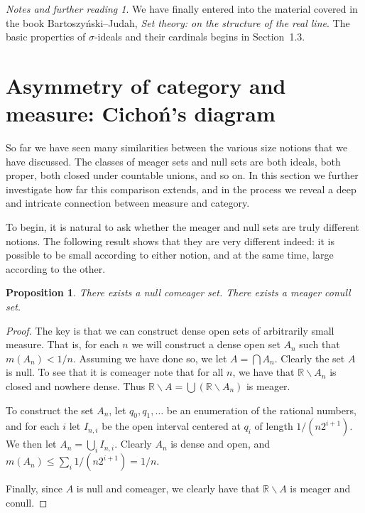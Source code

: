 \documentclass[11pt,oneside]{amsbook}
\newcommand{\RR}{\mathbb R}
\theoremstyle{definition}
\theoremstyle{plain}
\newtheorem{prop}[thm]{Proposition}
\theoremstyle{definition}
\theoremstyle{remark}
\newtheorem*{notes}{Notes and further reading}
\begin{document}
\begin{notes}
  We have finally entered into the material covered in the book Bartoszy\'nski--Judah, \emph{Set theory: on the structure of the real line}. The basic properties of $\sigma$-ideals and their cardinals begins in Section~1.3.
\end{notes}


\section{Asymmetry of category and measure: Cicho\'n's diagram}

So far we have seen many similarities between the various size notions that we have discussed. The classes of meager sets and null sets are both ideals, both proper, both closed under countable unions, and so on. In this section we further investigate how far this comparison extends, and in the process we reveal a deep and intricate connection between measure and category.

To begin, it is natural to ask whether the meager and null sets are truly different notions. The following result shows that they are very different indeed: it is possible to be small according to either notion, and at the same time, large according to the other.

\begin{prop}
  \label{prop:null-comeager}
  There exists a null comeager set. There exists a meager conull set.  \end{prop}

\begin{proof}
  The key is that we can construct dense open sets of arbitrarily small measure. That is, for each $n$ we will construct a dense open set $A_n$ such that $m(A_n)<1/n$. Assuming we have done so, we let $A=\bigcap A_n$. Clearly the set $A$ is null. To see that it is comeager note that for all $n$, we have that $\RR\smallsetminus A_n$ is closed and nowhere dense. Thus $\RR\smallsetminus A=\bigcup(\RR\smallsetminus A_n)$ is meager.

  To construct the set $A_n$, let $q_0,q_1,\ldots$ be an enumeration of the rational numbers, and for each $i$ let $I_{n,i}$ be the open interval centered at $q_i$ of length $1/(n2^{i+1})$. We then let $A_n=\bigcup_iI_{n,i}$. Clearly $A_n$ is dense and open, and $m(A_n)\leq\sum_i1/(n2^{i+1})=1/n$.

  Finally, since $A$ is null and comeager, we clearly have that $\RR\smallsetminus A$ is meager and conull.
\end{proof}
\end{document}
